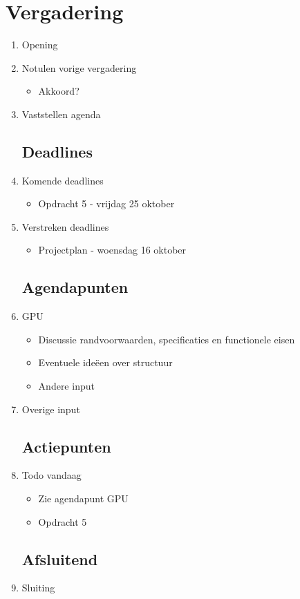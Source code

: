 \documentclass{article}
\begin{document}
\section*{Vergadering}
\begin{enumerate}
	
	\subsection*{Vooraf}
	\item Opening
	\item Notulen vorige vergadering
	\begin{itemize}
		\item Akkoord?
	\end{itemize}
	\item Vaststellen agenda

	\subsection*{Deadlines}
	\item Komende deadlines
	\begin{itemize}
		\item Opdracht 5 - vrijdag 25 oktober
	\end{itemize}
	\item Verstreken deadlines
	\begin{itemize}
		\item Projectplan - woensdag 16 oktober
	\end{itemize}

	\subsection*{Agendapunten}

	\item GPU
	\begin{itemize}
		\item Discussie randvoorwaarden, specificaties en functionele eisen
		\item Eventuele ideëen over structuur
		\item Andere input
	\end{itemize}

	\item Overige input
	\subsection*{Actiepunten}
	\item Todo vandaag
	\begin{itemize}
		\item Zie agendapunt GPU
		\item Opdracht 5
	\end{itemize}

	\noindent 
	\subsection*{Afsluitend}
	\item Sluiting

\end{enumerate}
\end{document}
